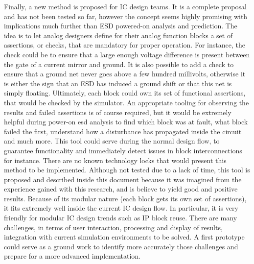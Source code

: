 Finally, a new method is proposed for IC design teams.
It is a complete proposal and has not been tested so far, however the concept seems highly promising with implications much further than ESD powered-on analysis and prediction.
The idea is to let analog designers define for their analog function blocks a set of assertions, or checks, that are mandatory for proper operation.
For instance, the check could be to ensure that a large enough voltage difference is present between the gate of a current mirror and ground.
It is also possible to add a check to ensure that a ground net never goes above a few hundred millivolts, otherwise it is either the sign that an ESD has induced a ground shift or that this net is simply floating.
Ultimately, each block could own its set of functional assertions, that would be checked by the simulator.
An appropriate tooling for observing the results and failed assertions is of course required, but it would be extremely helpful during power-on esd analysis to find which block was at fault, what block failed the first, understand how a disturbance has propagated inside the circuit and much more.
This tool could serve during the normal design flow, to guarantee functionality and immediately detect issues in block interconnections for instance.
There are no known technology locks that would present this method to be implemented.
Although not tested due to a lack of time, this tool is proposed and described inside this document because it was imagined from the experience gained with this research, and is believe to yield good and positive results.
Because of its modular nature (each block gets its own set of assertions), it fits extremely well inside the current IC design flow.
In particular, it is very friendly for modular IC design trends such as IP block reuse.
There are many challenges, in terms of user interaction, processing and display of results, integration with current simulation environments to be solved.
A first prototype could serve as a ground work to identify more accurately those challenges and prepare for a more advanced implementation.

